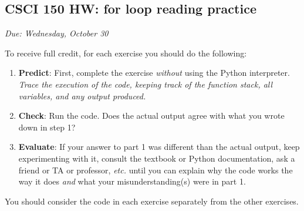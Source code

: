 \documentclass[]{article}
\date{}
\begin{document}
\hypertarget{csci-150-hw-for-loop-reading-practice}{%
\subsection{CSCI 150 HW: for loop reading
practice}\label{csci-150-hw-for-loop-reading-practice}}

\emph{Due: Wednesday, October 30}

To receive full credit, for each exercise you should do the following:

\begin{enumerate}
\def\labelenumi{\arabic{enumi}.}
\item
  \textbf{Predict}: First, complete the exercise \emph{without} using
  the Python interpreter. \emph{Trace the execution of the code, keeping
  track of the function stack, all variables, and any output produced.}
\item
  \textbf{Check}: Run the code. Does the actual output agree with what
  you wrote down in step 1?
\item
  \textbf{Evaluate}: If your answer to part 1 was different than the
  actual output, keep experimenting with it, consult the textbook or
  Python documentation, ask a friend or TA or professor, \emph{etc.}
  until you can explain why the code works the way it does \emph{and}
  what your misunderstanding(s) were in part 1.
\end{enumerate}

You should consider the code in each exercise separately from the other
exercises.
\end{document}
